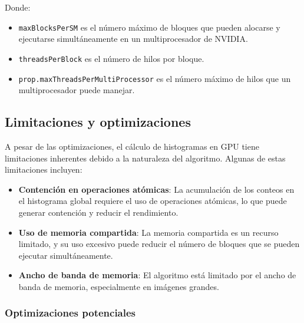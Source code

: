             Donde:
            
            \begin{itemize}
            
                \item \texttt{maxBlocksPerSM} es el número máximo de bloques que pueden alocarse y ejecutarse simultáneamente en un multiprocesador de NVIDIA.

                \item \texttt{threadsPerBlock} es el número de hilos por bloque.

                \item \texttt{prop.maxThreadsPerMultiProcessor} es el número máximo de hilos que un multiprocesador puede manejar.
                
            \end{itemize}

    \subsection{Limitaciones y optimizaciones}

        A pesar de las optimizaciones, el cálculo de histogramas en GPU tiene limitaciones inherentes debido a la naturaleza del algoritmo. Algunas de estas limitaciones incluyen:
        
        \begin{itemize}
        
            \item \textbf{Contención en operaciones atómicas}: La acumulación de los conteos en el histograma global requiere el uso de operaciones atómicas, lo que puede generar contención y reducir el rendimiento.
            
            \item \textbf{Uso de memoria compartida}: La memoria compartida es un recurso limitado, y su uso excesivo puede reducir el número de bloques que se pueden ejecutar simultáneamente.
            
            \item \textbf{Ancho de banda de memoria}: El algoritmo está limitado por el ancho de banda de memoria, especialmente en imágenes grandes.
            
        \end{itemize}

        \subsubsection{Optimizaciones potenciales}
    
